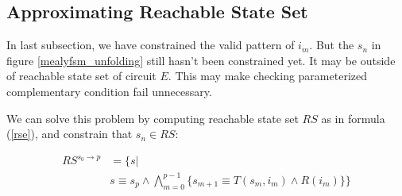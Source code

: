 \documentclass[journal]{IEEEtran}
\begin{document}
\subsection{Approximating Reachable State Set}\label{subsec_Prfx}
In last subsection, we have constrained the valid pattern of $i_m$.
But the $s_n$ in figure \ref{mealyfsm_unfolding} still hasn't been constrained yet.
It may be outside of reachable state set of circuit $E$.
This may make checking parameterized complementary condition fail unnecessary.

We can solve this problem by computing reachable state set $RS$ as in formula (\ref{rse}),
and constrain that $s_n\in RS$:

\begin{equation}\label{rse_p_forward}
\begin{split}
RS^{s_0\to p} & =  \Big\{s| \\
& s\equiv s_p\wedge \bigwedge_{m=0}^{p-1}\big\{
s_{m+1}\equiv T(s_m,i_m)\wedge R(i_m)
\big\}\Big\}
\end{split}
\end{equation}

\vspace{0.2cm}
\end{document}
